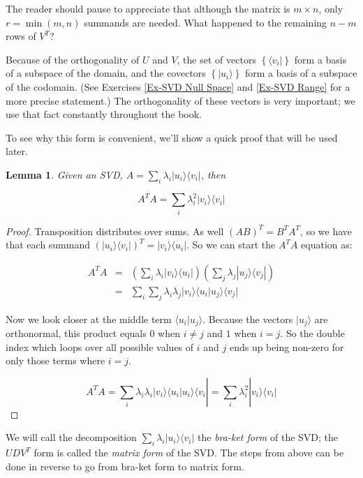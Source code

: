 \documentclass{amsbook}
\newtheorem{lemma}[theorem]{Lemma}
\begin{document}
The reader should pause to appreciate that although the matrix is $m\times n$, only $r=\min(m, n)$ summands are needed.  What happened to the remaining $n-m$ rows of $V^T$?

Because of the orthogonality of $U$ and $V$, the set of vectors $\left\{\langle v _i|\right\}$ form a basis of a subspace of the domain, and the covectors $\left\{| u_i \rangle\right\}$ form a basis of a subspace of the codomain.  (See Exercises \ref{Ex-SVD Null Space} and \ref{Ex-SVD Range} for a more precise statement.)  The orthogonality of these vectors is very important; we use that fact constantly throughout the book.

To see why this form is convenient, we'll show a quick proof that will be used later.

\begin{lemma}
\label{ata_eq}
Given an SVD, $A=\sum_i\lambda_i|u_i\rangle\langle v_i|$, then 

\begin{equation}
\label{ata_simplified}
A^TA=\sum_i\lambda_i^2|v_i\rangle\langle v_i|
\end{equation}
\end{lemma}

\begin{proof}
Transposition distributes over sums.  As well $(AB)^T=B^TA^T$, so we have that each summand $\left(|u_i\rangle\langle v_i|\right)^T=|v_i\rangle\langle u_i|$.  So we can start the $A^TA$ equation as:

$$
\begin{array}{rcl}
A^TA&=& \left(\sum_i\lambda_i|v_i\rangle\langle u_i|\right) \left(\sum_j\lambda_j|u_j\rangle\langle v_j|\right) \\
&=&\sum_i\sum_j\lambda_i\lambda_j|v_i\rangle\langle u_i|u_j\rangle\langle v_j|
\end{array}
$$

Now we look closer at the middle term $\langle u_i|u_j\rangle$.  Because the vectors $|u_j\rangle$ are orthonormal, this product equals $0$ when $i\neq j$ and $1$ when $i=j$.  So the double index which loops over all possible values of $i$ and $j$ ends up being non-zero for only those terms where $i=j$.

$$
A^TA = \sum_i\lambda_i\lambda_i|v_i\rangle\langle u_i|u_i\rangle\langle v_i| = \sum_i\lambda_i^2|v_i\rangle\langle v_i|
$$
\end{proof}

We will call the decomposition $\sum_i\lambda_i|u_i\rangle\langle v_i|$ the {\it bra-ket form} of the SVD; the $UDV^T$ form is called the {\it matrix form} of the SVD.  The steps from above can be done in reverse to go from bra-ket form to matrix form.
\end{document}
